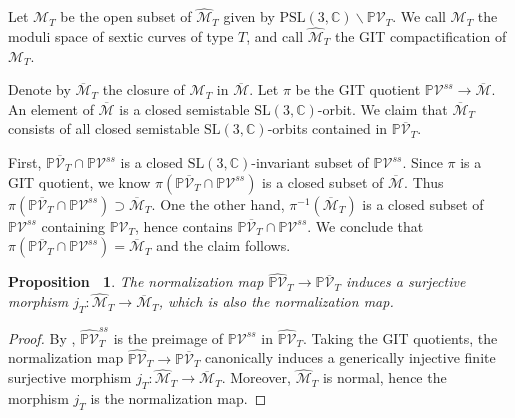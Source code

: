 \documentclass[12pt,reqno,a4paper]{amsart}
\newtheorem{prop}[thm]{Proposition~}
\theoremstyle{remark}
\theoremstyle{definition}
\begin{document}
Let $\mathcal{M}_T$ be the open subset of $\widehat{\mathcal{M}}_T$ given by $\mathrm{PSL}(3, \mathbb{C})\backslash \mathbb{P}\mathcal{V}_T$. We call $\mathcal{M}_T$ the moduli space of sextic curves of type $T$, and call $\widehat{\mathcal{M}}_T$ the GIT compactification of $\mathcal{M}_T$. 

Denote by $\overline{\mathcal{M}}_T$ the closure of $\mathcal{M}_T$ in $\overline{\mathcal{M}}$. Let $\pi$ be the GIT quotient $\mathbb{P}\mathcal{V}^{ss} \to \overline{\mathcal{M}}$. An element of $\overline{\mathcal{M}}$ is a closed semistable $\mathrm{SL}(3, \mathbb{C})$-orbit. We claim that $\overline{\mathcal{M}}_T$ consists of all closed semistable $\mathrm{SL}(3,\mathbb{C})$-orbits contained in $\mathbb{P}\overline{\mathcal{V}}_T$. 

First, $\mathbb{P}\overline{\mathcal{V}}_T \cap \mathbb{P}\mathcal{V}^{ss}$ is a closed $\mathrm{SL}(3,\mathbb{C})$-invariant subset of $\mathbb{P}\mathcal{V}^{ss}$. Since $\pi$ is a GIT quotient, we know $\pi(\mathbb{P}\overline{\mathcal{V}}_T \cap \mathbb{P}\mathcal{V}^{ss})$ is a closed subset of $\overline{\mathcal{M}}$. Thus $\pi(\mathbb{P}\overline{\mathcal{V}}_T \cap \mathbb{P}\mathcal{V}^{ss})\supset\overline{\mathcal{M}}_T$. One the other hand, $\pi^{-1}(\overline{\mathcal{M}}_T)$ is a closed subset of $\mathbb{P}\mathcal{V}^{ss}$ containing $\mathbb{P}\mathcal{V}_T$, hence contains $\mathbb{P}\overline{\mathcal{V}}_T \cap \mathbb{P}\mathcal{V}^{ss}$. We conclude that $\pi(\mathbb{P}\overline{\mathcal{V}}_T \cap \mathbb{P}\mathcal{V}^{ss})=\overline{\mathcal{M}}_T$ and the claim follows.



\begin{prop}
\label{prop: M_T M^bar normalization}
The normalization map $\widehat{\mathbb{P}\mathcal{V}}_T \to \mathbb{P}\overline{\mathcal{V}}_T$ induces a surjective morphism $j_T\colon \widehat{\mathcal{M}}_T\to \overline{\mathcal{M}}_T$, which is also the normalization map.
\end{prop}
\begin{proof}
By \cite[Theorem 1.19]{mumford1994geometric}, $\widehat{\mathbb{P}\mathcal{V}}_T^{ss}$ is the preimage of $\mathbb{P}\mathcal{V}^{ss}$ in $\widehat{\mathbb{P}\mathcal{V}}_T$. Taking the GIT quotients, the normalization map $\widehat{\mathbb{P}\mathcal{V}}_T \to \mathbb{P}\overline{\mathcal{V}}_T$ canonically induces a generically injective finite surjective morphism $j_T\colon\widehat{\mathcal{M}}_T \to \overline{\mathcal{M}}_T$. 
Moreover, $\widehat{\mathcal{M}}_T$ is normal, hence the morphism $j_T$ is the normalization map.
\end{proof}
\end{document}
